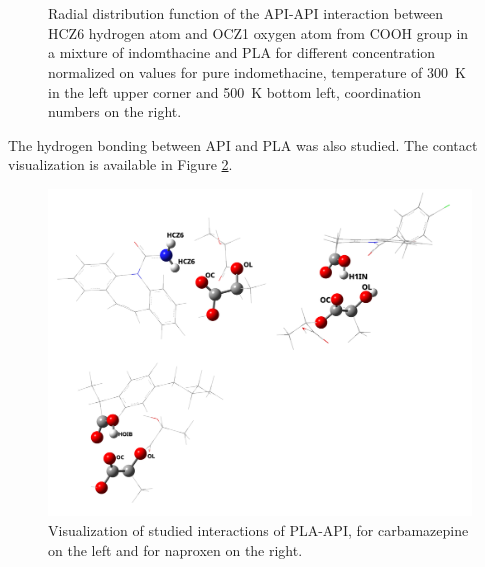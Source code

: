 \begin{figure}[htb!]
	\centering
	\\
	\\
	\caption{Radial distribution function of the API-API interaction between HCZ6 hydrogen atom and OCZ1 oxygen atom from COOH group in a mixture of indomthacine and PLA for different concentration normalized on values for pure indomethacine, temperature of 300~K in the left upper corner and 500~K bottom left, coordination numbers on the right.}
	\label{fig:indo_RDF_}
\end{figure}




The hydrogen bonding between API and PLA was also studied. The contact visualization is available in Figure \ref{fig:contact}.

\begin{figure}[htb!]
	\includegraphics[width=\linewidth]{img/all_pla_api_bp.png} 
	\caption{Visualization of studied interactions of PLA-API, for carbamazepine on the left and for naproxen on the right.}
	\label{fig:contact}    
\end{figure}


